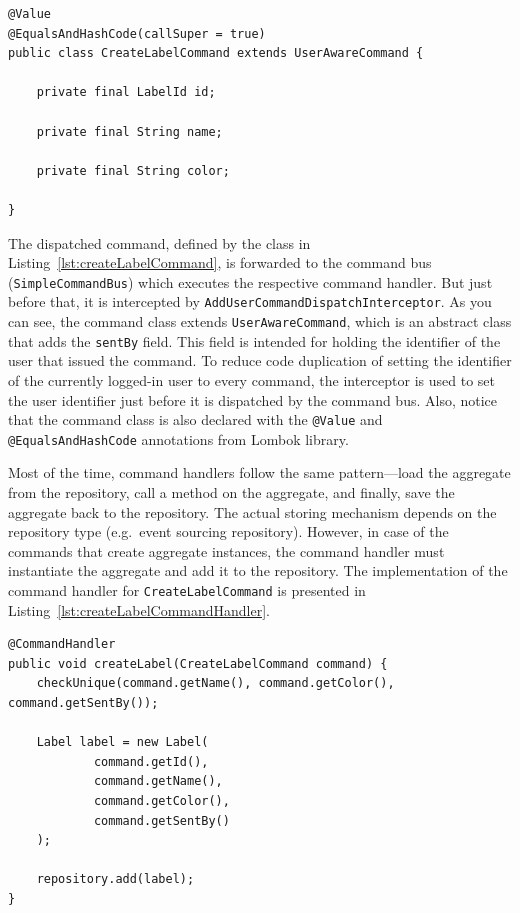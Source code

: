\documentclass{book}
\begin{document}
\begin{lstlisting}[caption={The \texttt{CreateLabelCommand} class},label={lst:createLabelCommand},captionpos=b,float,floatplacement=H]
@Value
@EqualsAndHashCode(callSuper = true)
public class CreateLabelCommand extends UserAwareCommand {

    private final LabelId id;

    private final String name;

    private final String color;

}
\end{lstlisting}

The dispatched command, defined by the class in Listing~\ref{lst:createLabelCommand}, is forwarded to the command bus
(\texttt{SimpleCommandBus}) which executes the respective command
handler. But just before that, it is intercepted by
\texttt{AddUserCommandDispatchInterceptor}. As you can see, the command
class extends \texttt{UserAwareCommand}, which is an abstract class that
adds the \texttt{sentBy} field. This field is intended for holding the
identifier of the user that issued the command. To reduce code
duplication of setting the identifier of the currently logged-in user to
every command, the interceptor is used to set the user identifier just
before it is dispatched by the command bus. Also, notice that the
command class is also declared with the \texttt{@Value} and
\texttt{@EqualsAndHashCode} annotations from Lombok library.

Most of the time, command handlers follow the same pattern---load the
aggregate from the repository, call a method on the aggregate, and
finally, save the aggregate back to the repository. The actual storing
mechanism depends on the repository type (e.g.~event sourcing
repository). However, in case of the commands that create aggregate
instances, the command handler must instantiate the aggregate and add it
to the repository. The implementation of the command handler for
\texttt{CreateLabelCommand} is presented in Listing~\ref{lst:createLabelCommandHandler}.

\begin{lstlisting}[caption={The command handler for \texttt{CreateLabelCommand}},label={lst:createLabelCommandHandler},captionpos=b,float,floatplacement=H]
@CommandHandler
public void createLabel(CreateLabelCommand command) {
    checkUnique(command.getName(), command.getColor(), command.getSentBy());

    Label label = new Label(
            command.getId(),
            command.getName(),
            command.getColor(),
            command.getSentBy()
    );

    repository.add(label);
}
\end{lstlisting}
\end{document}
